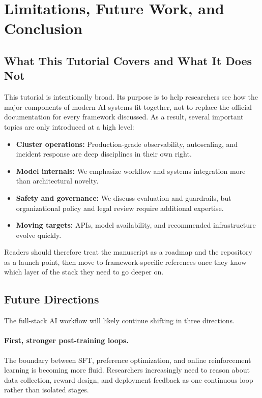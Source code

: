 \documentclass[class=article,crop=false]{standalone}
\begin{document}
\section{Limitations, Future Work, and Conclusion}
\label{sec:conclusion}

\subsection{What This Tutorial Covers and What It Does Not}
\label{sec:conclusion:limits}

This tutorial is intentionally broad. Its purpose is to help researchers see how the major components of modern AI systems fit together, not to replace the official documentation for every framework discussed. As a result, several important topics are only introduced at a high level:
\begin{itemize}
  \item \textbf{Cluster operations:} Production-grade observability, autoscaling, and incident response are deep disciplines in their own right.
  \item \textbf{Model internals:} We emphasize workflow and systems integration more than architectural novelty.
  \item \textbf{Safety and governance:} We discuss evaluation and guardrails, but organizational policy and legal review require additional expertise.
  \item \textbf{Moving targets:} APIs, model availability, and recommended infrastructure evolve quickly.
\end{itemize}

Readers should therefore treat the manuscript as a roadmap and the repository as a launch point, then move to framework-specific references once they know which layer of the stack they need to go deeper on.

\subsection{Future Directions}
\label{sec:conclusion:future}

The full-stack AI workflow will likely continue shifting in three directions.

\paragraph{First, stronger post-training loops.}
The boundary between SFT, preference optimization, and online reinforcement learning is becoming more fluid. Researchers increasingly need to reason about data collection, reward design, and deployment feedback as one continuous loop rather than isolated stages.
\end{document}
